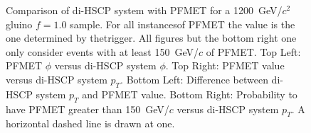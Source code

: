 \begin{figure}
\begin{center}
      \caption[Comparison of di-HSCP system $\phi$ and \pt\ with PFMET for a 1200~GeV/$c^2$ 
gluino $f=1.0$ sample in events with at least 150~GeV/$c$ of PFMET.]
              {Comparison of di-HSCP system with PFMET for a 1200~GeV/$c^2$ gluino $f=1.0$ sample. For all instancesof PFMET the value is the one determined by thetrigger.
		All figures but the bottom right one only consider events with at least 150~GeV/$c$ of PFMET. 
         Top Left: PFMET $\phi$ versus di-HSCP system $\phi.$ Top Right: PFMET value versus di-HSCP system $p_T$. 
         Bottom Left: Difference between di-HSCP system $p_T$ and PFMET value.
         Bottom Right: Probability to have PFMET greater than 150~GeV/$c$ versus di-HSCP system $p_T$. A horizontal dashed line is drawn at one.
        }
      \label{fig:SystPtTrigger}
  \end{center}
\end{figure}

